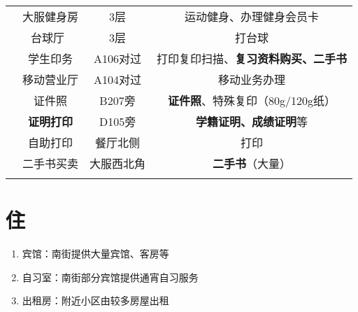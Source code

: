 \begin{table}[H]
\begin{tabular}{|c|c|c|c|}
        \cline{2-4}
                              & 大服健身房\footnotemark           & 3层                    %
                              & 运动健身、办理健身会员卡                                         \\
        \cline{2-4}
                              & 台球厅\                         & 3层     & 打台球          \\
        \Xhline{1.2pt}
        \multirow{3}{*}{中和广场} & 学生印务                         & A106对过                %
                              & 打印复印扫描、\textbf{复习资料购买、二手书}                           \\
        \cline{2-4}
                              & 移动营业厅                        & A104对过 & 移动业务办理       \\
        \Xhline{1.2pt}
        \multirow{4}{*}{其他}   & 证件照                          & B207旁                 %
                              & \textbf{证件照}、特殊复印（80g/120g纸）                         \\
        \cline{2-4}
                              & \textbf{证明打印}                & D105旁                 %
                              & \textbf{学籍证明、成绩证明}等                                  \\
        \cline{2-4}
                              & 自助打印                         & 餐厅北侧   & 打印           \\
        \cline{2-4}
                              & 二手书买卖                        & 大服西北角                 %
                              & \textbf{二手书}（大量）                                     \\
        \Xhline{1.2pt}
    \end{tabular}
\end{table}

\section[住]{住}
\begin{enumerate}
    \item 宾馆：南街提供大量宾馆、客房等
    \item 自习室：南街部分宾馆提供通宵自习服务
    \item 出租房：附近小区由较多房屋出租\footnotemark
\end{enumerate}

